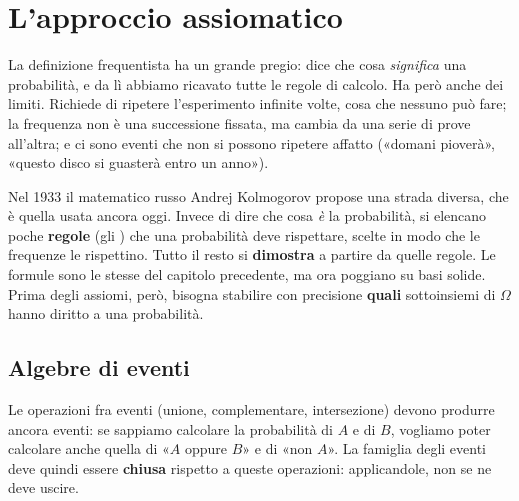 \chapter{L'approccio assiomatico}

La definizione frequentista ha un grande pregio: dice che cosa \emph{significa} una probabilità, e da lì abbiamo
ricavato tutte le regole di calcolo. Ha però anche dei limiti. Richiede di ripetere l'esperimento infinite volte, cosa
che nessuno può fare; la frequenza non è una successione fissata, ma cambia da una serie di prove all'altra; e ci sono
eventi che non si possono ripetere affatto («domani pioverà», «questo disco si guasterà entro un anno»).

Nel 1933 il matematico russo Andrej Kolmogorov propose una strada diversa, che è quella usata ancora oggi. Invece di
dire che cosa \emph{è} la probabilità, si elencano poche \textbf{regole} (gli ) che una probabilità deve
rispettare, scelte in modo che le frequenze le rispettino. Tutto il resto si \textbf{dimostra} a partire da quelle
regole. Le formule sono le stesse del capitolo precedente, ma ora poggiano su basi solide. Prima degli assiomi, però,
bisogna stabilire con precisione \textbf{quali} sottoinsiemi di $\Omega$ hanno diritto a una probabilità.

\section{Algebre di eventi}

Le operazioni fra eventi (unione, complementare, intersezione) devono produrre ancora eventi: se sappiamo calcolare la
probabilità di $A$ e di $B$, vogliamo poter calcolare anche quella di «$A$ oppure $B$» e di «non $A$». La famiglia
degli eventi deve quindi essere \textbf{chiusa} rispetto a queste operazioni: applicandole, non se ne deve uscire.


